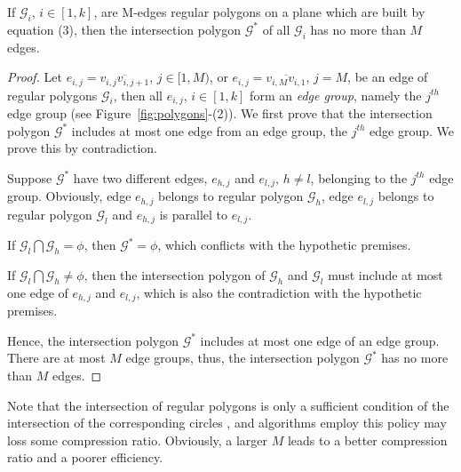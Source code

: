 \begin{theorem}
\label{prop-rp-intersection}
If $\mathcal{G}_i$, $i \in [1, k]$, are M-edges regular polygons on a plane which are built by equation (3), then the intersection polygon
$\mathcal{G}^*$ of all $\mathcal{G}_i$ has no more than $M$ edges.
\end{theorem}


\begin{proof}
Let $e_{i,j} = \overline{v_{i,j}v_{i,j+1}}$, $j\in [1,M)$, or $e_{i,j} = \overline{v_{i,M}v_{i,1}}$, $j = M$, be an edge of regular polygons
$\mathcal{G}_i$, then all $e_{i,j}$, $i\in [1, k]$ form an \emph{edge group}, namely the $j^{th}$ edge group (see
Figure~\ref{fig:polygons}-(2)).
We first prove that the intersection polygon $\mathcal{G}^*$ includes at most one edge from an edge group, \eg the $j^{th}$ edge group.
We prove this by contradiction.

Suppose $\mathcal{G}^*$ have two different edges, $e_{h,j}$ and $e_{l,j}$, $h\ne l$, belonging to the $j^{th}$ edge group. Obviously, edge
$e_{h,j}$ belongs to regular polygon $\mathcal{G}_h$, edge $e_{l,j}$ belongs to regular polygon $\mathcal{G}_l$ and $e_{h,j}$ is parallel to
$e_{l,j}$.

If $\mathcal{G}_l \bigcap \mathcal{G}_h = \phi$, then $\mathcal{G}^*=\phi$, which conflicts with the hypothetic premises.

If $\mathcal{G}_l \bigcap \mathcal{G}_h \ne \phi$, then the intersection polygon of $\mathcal{G}_h$ and $\mathcal{G}_l$ must include at most
one edge of $e_{h,j}$ and $e_{l,j}$, which is also the contradiction with the hypothetic premises.

Hence, the intersection polygon $\mathcal{G}^*$ includes at most one edge of an edge group.
%
There are at most $M$ edge groups, thus, the intersection polygon $\mathcal{G}^*$ has no more than $M$ edges.
\end{proof}

Note that the intersection of regular polygons is only a sufficient condition of the intersection of the corresponding circles , and
algorithms employ this policy may loss some compression ratio. Obviously, a larger $M$ leads to a better compression ratio and a poorer
efficiency.

